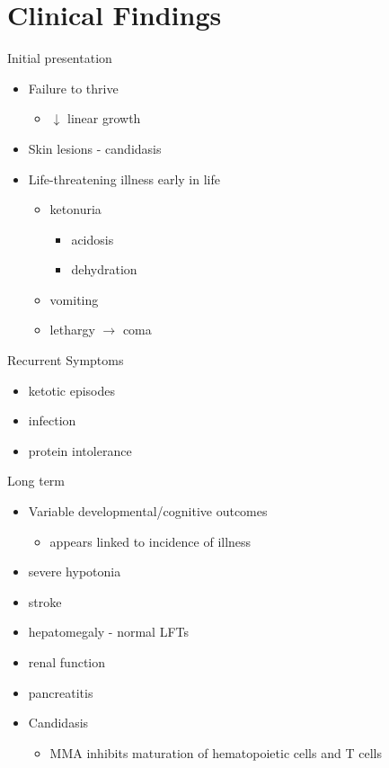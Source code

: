 \documentclass[presentation, smaller]{beamer}
\begin{document}
\section{Clinical Findings}
\label{sec:orgheadline24}
\begin{frame}[label={sec:orgheadline19}]{Initial presentation}
\begin{itemize}
\item Failure to thrive
\begin{itemize}
\item \(\downarrow\) linear growth
\end{itemize}
\item Skin lesions - candidasis
\item Life-threatening illness early in life
\begin{itemize}
\item ketonuria
\begin{itemize}
\item acidosis
\item dehydration
\end{itemize}
\item vomiting
\item lethargy \(\to\) coma
\end{itemize}
\end{itemize}
\end{frame}

\begin{frame}[label={sec:orgheadline20}]{Recurrent Symptoms}
\begin{itemize}
\item ketotic episodes
\item infection
\item protein intolerance
\end{itemize}
\end{frame}

\begin{frame}[label={sec:orgheadline21}]{Long term}
\begin{itemize}
\item Variable developmental/cognitive outcomes
\begin{itemize}
\item appears linked to incidence of illness
\end{itemize}
\item severe hypotonia

\item stroke
\item hepatomegaly - normal LFTs
\item \downarrown renal function
\item pancreatitis
\item Candidasis
\begin{itemize}
\item MMA inhibits maturation of hematopoietic cells and T cells
\end{itemize}
\end{itemize}
\end{frame}
\end{document}
